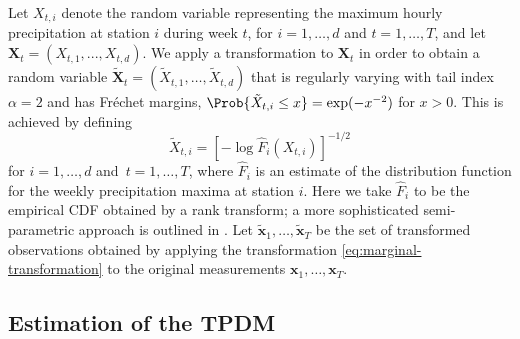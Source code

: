 \documentclass[en-GB, a4paper, nobind]{templates/bathreport}
\begin{document}
Let \(X_{t,i}\) denote the random variable representing the maximum hourly precipitation at station \(i\) during week \(t\), for \(i=1,\ldots,d\) and \(t=1,\ldots,T\), and let \(\bm{X}_t=(X_{t,1},...,X_{t,d})\). We apply a transformation to \(\bm{X}_t\) in order to obtain a random variable \(\tilde{\bm{X}}_t = (\tilde{X}_{t,1},\ldots,\tilde{X}_{t,d})\) that is regularly varying with tail index \(\alpha=2\) and has Fréchet margins, \(\Prob{\tilde{X}_{t,i}\leq x} = \exp(-x^{-2})\) for \(x>0\). This is achieved by defining
\begin{equation}
\tilde{X}_{t,i} = \left[-\log \hat{F}_i(X_{t,i})\right]^{-1/2}
\label{eq:marginal-transformation}
\end{equation}
for \(i=1,\ldots,d\) and \(\, t=1,\ldots,T\), where \(\hat{F}_i\) is an estimate of the distribution function for the weekly precipitation maxima at station \(i\). Here we take \(\hat{F}_i\) to be the empirical CDF obtained by a rank transform; a more sophisticated semi-parametric approach is outlined in \textcite{rohrbeckSimulatingFloodEvent2021}. Let \(\tilde{\bm{x}}_1,\ldots,\tilde{\bm{x}}_T\) be the set of transformed observations obtained by applying the transformation \eqref{eq:marginal-transformation} to the original measurements \(\bm{x}_1,\ldots,\bm{x}_T\).

\hypertarget{estimation-tpdm}{%
\subsection{Estimation of the TPDM}\label{estimation-tpdm}}
\end{document}
